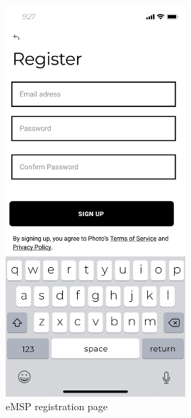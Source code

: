 \documentclass{Configuration_Files/PoliMi3i_thesis}
\begin{document}
\begin{figure}[H]
    \centering
    \includegraphics[width=0.6\textwidth]{Images/user-interface/emsp/eMSP (1)-03.png}
    \caption{eMSP registration page}
\end{figure}
\end{document}
